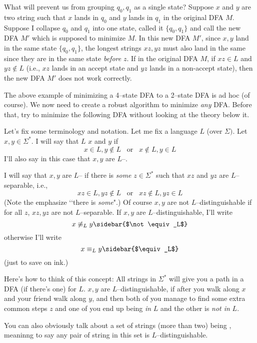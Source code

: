 What will prevent us from grouping $q_0, q_1$ as a single state?
Suppose $x$ and $y$ are two string such that
$x$ lands in $q_0$ and $y$ lands in $q_1$ in the original DFA $M$.
Suppose I collapse $q_0$ and $q_1$ into one state, called it $\{q_0, q_1\}$ and call the new DFA $M'$ which is supposed to minimize $M$.
In this new DFA $M'$, since $x,y$ land in the same state $\{q_0, q_1\}$, the longest strings $xz, yz$ must also land in the same since they are in the same state
\textit{before} $z$.
If in the original DFA $M$, if $xz \in L$ and $yz \not\in L$ (i.e., $xz$ lands in an accept state and $yz$ lands in a non-accept state), then the new DFA $M'$
does not work correctly.

The above example of minimizing a 4--state DFA to a 2--state
DFA is ad hoc (of course).
We now need to create a robust algorithm to minimize \textit{any} DFA.
Before that, try to minimize the following DFA without looking at the theory below it.

\newpage


\newpage
Let's fix some terminology and notation.
Let me fix a language $L$ (over $\Sigma)$.
Let $x, y \in \Sigma^*$.
I will say that $L$  $x$ and $y$ if
\[
x \in L, y \not\in L \,\,\, \text{ or } \,\,\, x \not\in L, y \in L  
\]
I'll also say in this case that $x,y$ are $L$--.

I will say that $x,y$ are $L$-- if
there is \textit{some} $z \in \Sigma^*$ such that
$xz$ and $yz$ are $L$--separable, i.e.,
\[
xz \in L, yz \not\in L \,\,\, \text{ or } \,\,\, xz \not\in L, yz \in L  
\]
(Note the emphasize \lq\lq there is \textit{some}".)
Of course $x,y$ are not $L$--distinguishable if
for all $z$, $xz,yz$ are not $L$--separable.
If $x,y$ are $L$--distinguishable, I'll write 
\[
x \not\equiv_L y \sidebar{$\not\equiv_L$}\index{$\not\equiv_L$}
\]
otherwise I'll write
\[
x \equiv_L y \sidebar{$\equiv_L$}\index{$\equiv_L$}
\]
(just to save on ink.)

Here's how to think of this concept:
All strings in $\Sigma^*$ will give you a path in a DFA (if there's one) for $L$.
$x,y$ are $L$--distinguishable, if after you walk along $x$ and your friend walk along $y$,
and then both of you manage to find some extra common steps $z$ and one of
you end up being \textit{in} $L$ and the other is \textit{not in} $L$.

You can also obviously talk about a set of strings (more than two) being
, meaninng to say
any pair of string in this set is $L$--distinguishable.

